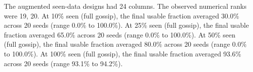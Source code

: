 The augmented seen-data designs had 24 columns. The observed numerical ranks were 19, 20. At 10\% seen (full gossip), the final usable fraction averaged 30.0\% across 20 seeds (range 0.0\% to 100.0\%). At 25\% seen (full gossip), the final usable fraction averaged 65.0\% across 20 seeds (range 0.0\% to 100.0\%). At 50\% seen (full gossip), the final usable fraction averaged 80.0\% across 20 seeds (range 0.0\% to 100.0\%). At 100\% seen (full gossip), the final usable fraction averaged 93.6\% across 20 seeds (range 93.1\% to 94.2\%).
